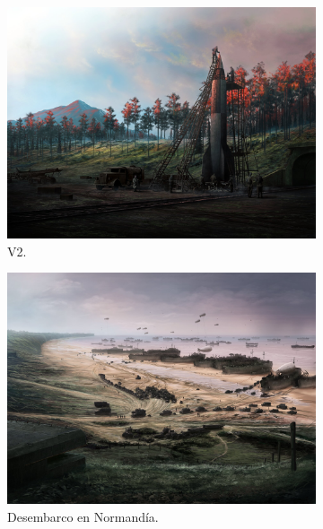 %
\begin{figure}[H]
	\centering
	\begin{subfigure}[b]{0.45\textwidth}
		\centering
		\includegraphics[width=\textwidth, frame]{cuerpo/cap-objetos/imagenes/hoi4-v2}
		\caption{V2.}
		\label{fig:hoi4-v2}
	\end{subfigure}
	\begin{subfigure}[b]{0.45\textwidth}
		\centering
		\includegraphics[width=\textwidth, frame]{cuerpo/cap-objetos/imagenes/hoi4-normandy-landing}
		\caption{Desembarco en Normandía.}
		\label{fig:hoi4-normandia}
	\end{subfigure}
	\hfill
		\begin{subfigure}[b]{0.45\textwidth}

\end{subfigure}
\end{figure}
